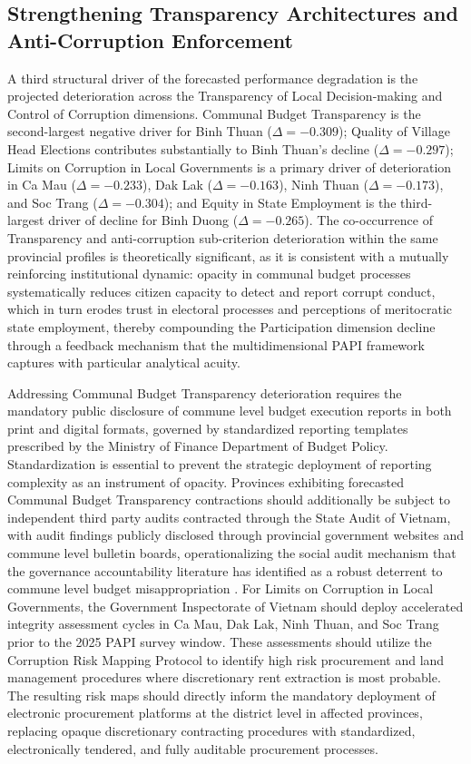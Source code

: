 \documentclass[12pt,a4paper]{article}
\begin{document}
\subsection{Strengthening Transparency Architectures and Anti-Corruption Enforcement}
\label{subsec:policy_transparency}

A third structural driver of the forecasted performance degradation is the projected deterioration across the Transparency of Local Decision-making and Control of Corruption dimensions. Communal Budget Transparency is the second-largest negative driver for Binh Thuan ($\Delta = -0.309$); Quality of Village Head Elections contributes substantially to Binh Thuan's decline ($\Delta = -0.297$); Limits on Corruption in Local Governments is a primary driver of deterioration in Ca Mau ($\Delta = -0.233$), Dak Lak ($\Delta = -0.163$), Ninh Thuan ($\Delta = -0.173$), and Soc Trang ($\Delta = -0.304$); and Equity in State Employment is the third-largest driver of decline for Binh Duong ($\Delta = -0.265$). The co-occurrence of Transparency and anti-corruption sub-criterion deterioration within the same provincial profiles is theoretically significant, as it is consistent with a mutually reinforcing institutional dynamic: opacity in communal budget processes systematically reduces citizen capacity to detect and report corrupt conduct, which in turn erodes trust in electoral processes and perceptions of meritocratic state employment, thereby compounding the Participation dimension decline through a feedback mechanism that the multidimensional PAPI framework captures with particular analytical acuity.

Addressing Communal Budget Transparency deterioration requires the mandatory public disclosure of commune level budget execution reports in both print and digital formats, governed by standardized reporting templates prescribed by the Ministry of Finance Department of Budget Policy. Standardization is essential to prevent the strategic deployment of reporting complexity as an instrument of opacity. Provinces exhibiting forecasted Communal Budget Transparency contractions should additionally be subject to independent third party audits contracted through the State Audit of Vietnam, with audit findings publicly disclosed through provincial government websites and commune level bulletin boards, operationalizing the social audit mechanism that the governance accountability literature has identified as a robust deterrent to commune level budget misappropriation \citep{Banerjee2010, Fox2015}. For Limits on Corruption in Local Governments, the Government Inspectorate of Vietnam should deploy accelerated integrity assessment cycles in Ca Mau, Dak Lak, Ninh Thuan, and Soc Trang prior to the 2025 PAPI survey window. These assessments should utilize the Corruption Risk Mapping Protocol to identify high risk procurement and land management procedures where discretionary rent extraction is most probable. The resulting risk maps should directly inform the mandatory deployment of electronic procurement platforms at the district level in affected provinces, replacing opaque discretionary contracting procedures with standardized, electronically tendered, and fully auditable procurement processes.
\end{document}
